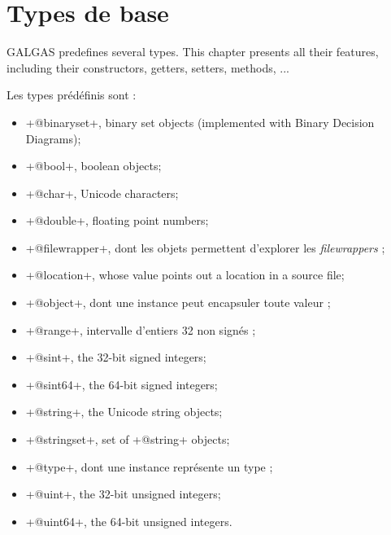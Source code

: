 
\chapter{Types de base}\label{predefinedTypes}

GALGAS predefines several types. This chapter presents all their features, including their constructors, getters, setters, methods, ...


Les types prédéfinis sont :
\begin{itemize}
\item \ggst+@binaryset+, binary set objects (implemented with Binary Decision Diagrams);
\item \ggst+@bool+, boolean objects;
\item \ggst+@char+, Unicode characters;
\item \ggst+@double+, floating point numbers;
\item \ggst+@filewrapper+, dont les objets permettent d'explorer les \emph{filewrappers} ;
\item \ggst+@location+, whose value points out a location in a source file;
\item \ggst+@object+, dont une instance peut encapsuler toute valeur ;
\item \ggst+@range+, intervalle d'entiers 32 non signés ;
\item \ggst+@sint+, the 32-bit signed integers;
\item \ggst+@sint64+, the 64-bit signed integers;
\item \ggst+@string+, the Unicode string objects;
\item \ggst+@stringset+, set of \ggst+@string+ objects;
\item \ggst+@type+, dont une instance représente un type ;
\item \ggst+@uint+, the 32-bit unsigned integers;
\item \ggst+@uint64+, the 64-bit unsigned integers.
\end{itemize}

